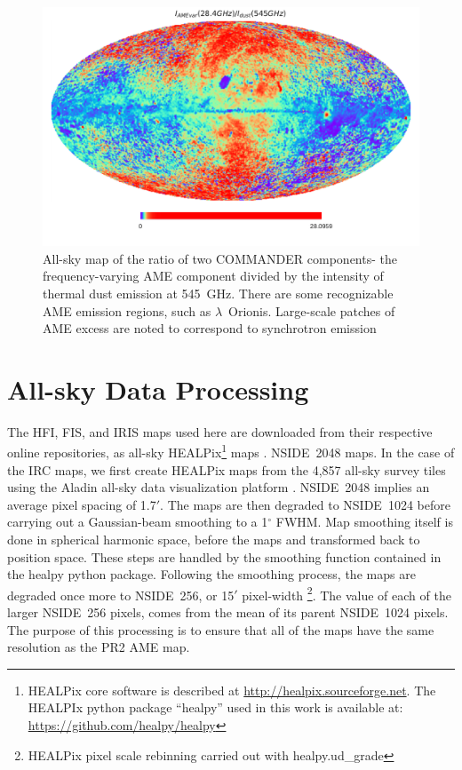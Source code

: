     \begin{figure}
         \centering
         \includegraphics[width=\textwidth]{../Plots/ch_datasources/R_PCAMEtoPCRad.pdf}
         \caption{All-sky map of the ratio of two COMMANDER components- the frequency-varying AME component divided by the intensity of thermal dust emission at 545~GHz. There are some recognizable AME emission regions, such as $\lambda$~Orionis. Large-scale patches of AME excess are noted to correspond to synchrotron emission \citep{hensley16}}
         \label{fig:R_PCAMEtoPCdust}
     \end{figure}

  \section{All-sky Data Processing}

        The HFI, FIS, and IRIS maps used here are downloaded from their respective online repositories, as all-sky HEALPix\footnote{HEALPix core software is described at \url{http://healpix.sourceforge.net}. The HEALPIx python package ``healpy'' used in this work is available at: \url{https://github.com/healpy/healpy}} maps \citep{gorski05}.   NSIDE~2048 maps. In the case of the IRC maps, we first create HEALPix maps from the 4,857 all-sky survey tiles using the Aladin all-sky data visualization platform \citep{bonnarel00}. NSIDE~2048 implies an average pixel spacing of 1.7$'$. The maps are then degraded to NSIDE~1024 before carrying out a Gaussian-beam smoothing to a 1$^{\circ}$ FWHM. Map smoothing itself is done in spherical harmonic space, before the maps and transformed back to position space. These steps are handled by the smoothing function contained in the healpy python package. Following the smoothing process, the maps are degraded once more to NSIDE~256, or 15$'$ pixel-width \footnote{HEALPix pixel scale rebinning carried out with healpy.ud\_grade}. The value of each of the larger NSIDE~256 pixels, comes from the mean of its parent NSIDE~1024 pixels. The purpose of this processing is to ensure that all of the maps have the same resolution as the PR2 AME map.
